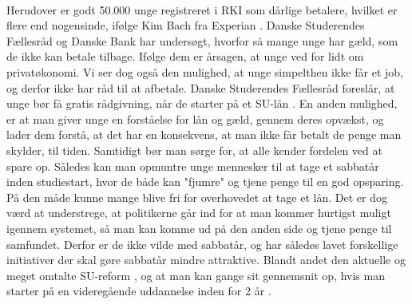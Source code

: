 \\
Herudover er godt 50.000 unge registreret i RKI som dårlige betalere, hvilket er flere end nogensinde, ifølge Kim Bach fra Experian \cite{dr.dk}. Danske Studerendes Fællesråd og Danske Bank har undersøgt, hvorfor så mange unge har gæld, som de ikke kan betale tilbage. Ifølge dem er årsagen, at unge ved for lidt om privatøkonomi. Vi ser dog også den mulighed, at unge simpelthen ikke får et job, og derfor ikke har råd til at afbetale. Danske Studerendes Fællesråd foreslår, at unge bør få gratis rådgivning, når de starter på et SU-lån \cite{dr.dk}. En anden mulighed, er at man giver unge en forståelse for lån og gæld, gennem deres opvækst, og lader dem forstå, at det har en konsekvens, at man ikke får betalt de penge man skylder, til tiden. Samtidigt bør man sørge for, at alle kender fordelen ved at spare op. Således kan man opmuntre unge mennesker til at tage et sabbatår inden studiestart, hvor de både kan "fjumre" og tjene penge til en god opsparing. På den måde kunne mange blive fri for overhovedet at tage et lån.
Det er dog værd at understrege, at politikerne går ind for at man kommer hurtigst muligt igennem systemet, så man kan komme ud på den anden side og tjene penge til samfundet. Derfor er de ikke vilde med sabbatår, og har således lavet forskellige initiativer der skal gøre sabbatår mindre attraktive. Blandt andet den aktuelle og meget omtalte SU-reform \cite{SUreform}, og at man kan gange sit gennemsnit op, hvis man starter på en videregående uddannelse inden for 2 år \cite{SabbatAar}.
 
